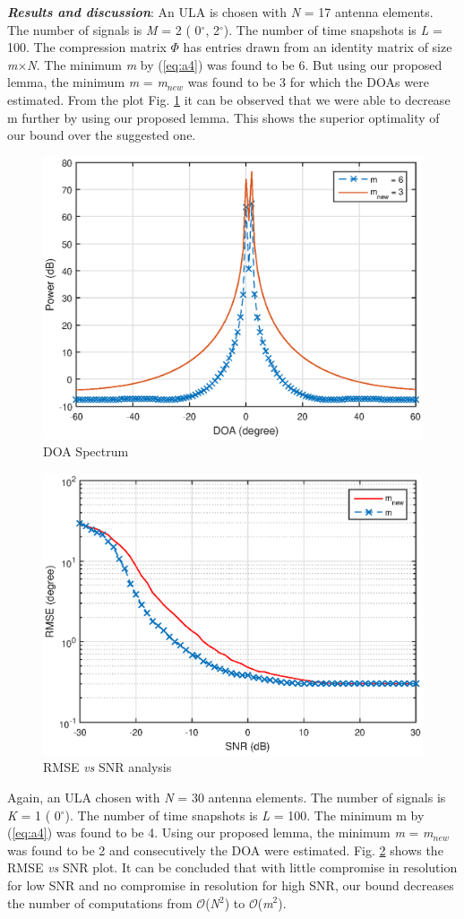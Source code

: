 \documentclass[12pt,a4paper]{article}
\theoremstyle{plain}
\theoremstyle{definition}
\begin{document}
\textbf{\emph{Results and discussion}}: 
An ULA is chosen with \textit{N} = 17 antenna elements. The number of signals is \textit{M} = 2 ( 0$^\circ$, 2$^\circ$). The number of
time snapshots is \textit{L} = 100. The compression matrix $\Phi$ has entries drawn from an identity matrix of size \textit{m}$\times$\textit{N}. The minimum \textit{m} by (\ref{eq:a4}) was found to be 6. But using our proposed lemma, the minimum \textit{m} = \textit{m}$_{new}$ was found to be 3 for which the DOAs were estimated. From the plot Fig. \ref{figa2} it can be observed that we were able to decrease m further by using our proposed lemma. This shows the superior optimality of our bound over the suggested one. 
\begin{figure}[h]
\centering
\includegraphics[width=90 mm]{figs/Spectrum_1.eps}
\caption{DOA Spectrum}
\label{figa2}
\end{figure}
\begin{figure}[h]
\centering
\includegraphics[width=90 mm]{figs/RMSE_2.eps}
\caption{RMSE \textit{vs} SNR analysis}
\label{figa3}
\end{figure}
\newline Again, an ULA chosen with \textit{N} = 30 antenna elements. The number of signals is \textit{K} = 1 ( 0$^\circ$). The number of time snapshots is \textit{L} = 100. The minimum m by (\ref{eq:a4}) was found to be 4. Using our proposed lemma, the minimum \textit{m} = \textit{m}$_{new}$ was found to be 2 and consecutively the DOA were estimated. Fig. \ref{figa3} shows the RMSE \textit{vs} SNR plot. It can be concluded that with little compromise in resolution for low SNR and no compromise in resolution for high SNR, our bound decreases the number of computations from $\mathcal{O}$(\textit{N}$^2$) to $\mathcal{O}$(\textit{m}$^2$).
\end{document}

